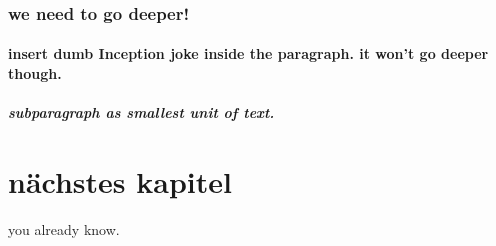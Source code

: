 \documentclass{article}
\begin{document}
            \subsubsection{we need to go deeper!}

                \paragraph{insert dumb Inception joke inside the paragraph. it won't go deeper though.} 
                   
                    \subparagraph{subparagraph as smallest unit of text.}

    \section{nächstes kapitel}
    you already know. 

    
    
\end{document}
